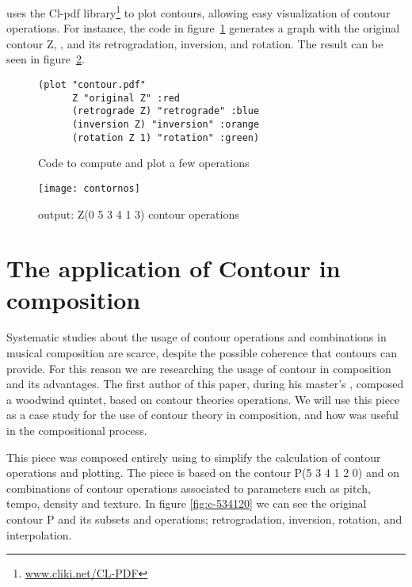 \goiaba{} uses the Cl-pdf library\footnote{\url{www.cliki.net/CL-PDF}}
to plot contours, allowing easy visualization of contour operations.
For instance, the code in figure~\ref{fig:operations-code} generates a
graph with the original contour Z, , and its
retrogradation, inversion, and rotation. The result can be seen in
figure~\ref{fig:operacoes}.

\begin{figure}
  \centering
\begin{verbatim}
(plot "contour.pdf"
      Z "original Z" :red
      (retrograde Z) "retrograde" :blue
      (inversion Z) "inversion" :orange
      (rotation Z 1) "rotation" :green)
\end{verbatim}
  \caption{Code to compute and plot a few operations}
  \label{fig:operations-code}
\end{figure}

\begin{figure}
  \centering
  \texttt{[image: contornos]}
  \caption{\goiaba{} output: Z(0 5 3 4 1 3) contour operations}
  \label{fig:operacoes}
\end{figure}

\section{The application of Contour in composition}
\label{sec:cont-appl-comp}

Systematic studies about the usage of contour operations and
combinations in musical composition are scarce, despite the possible
coherence that contours can provide. For this reason we are
researching the usage of contour in composition and its advantages.
The first author of this paper, during his master's
\cite{sampaio08:em}, composed a woodwind quintet,
based on contour theories operations. We will use this piece as a case
study for the use of contour theory in composition, and how \goiaba{}
was useful in the compositional process.

This piece
was composed entirely using \goiaba{} to simplify the calculation of
contour operations and plotting. The piece is based on the contour P(5
3 4 1 2 0) and on combinations of contour operations associated to
parameters such as pitch, tempo, density and texture. In figure
\ref{fig:c-534120} we can see the original contour P and its subsets
and operations; retrogradation, inversion, rotation, and
interpolation.

